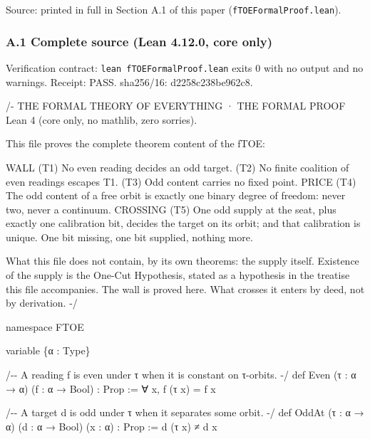 \documentclass[10pt]{article}
\renewcommand{\_}{\origunderscore\allowbreak}
\newenvironment{Shaded}{}{}
\newcommand{\NormalTok}[1]{#1}
\begin{document}
Source: printed in full in Section A.1 of this paper
(\texttt{fTOE\_Formal\_Proof.lean}).

\hypertarget{a.1-complete-source-lean-4.12.0-core-only}{%
\subsubsection{A.1 Complete source (Lean 4.12.0, core
only)}\label{a.1-complete-source-lean-4.12.0-core-only}}

Verification contract: \texttt{lean\ fTOE\_Formal\_Proof.lean} exits 0
with no output and no warnings. Receipt: PASS. sha256/16:
d2258c238be962c8.

\begin{Shaded}
\begin{Highlighting}[]
\NormalTok{/{-}}
\NormalTok{THE FORMAL THEORY OF EVERYTHING · THE FORMAL PROOF}
\NormalTok{Lean 4 (core only, no mathlib, zero sorries).}

\NormalTok{This file proves the complete theorem content of the fTOE:}

\NormalTok{  WALL      (T1) No even reading decides an odd target.}
\NormalTok{            (T2) No finite coalition of even readings escapes T1.}
\NormalTok{            (T3) Odd content carries no fixed point.}
\NormalTok{  PRICE     (T4) The odd content of a free orbit is exactly one binary}
\NormalTok{                 degree of freedom: never two, never a continuum.}
\NormalTok{  CROSSING  (T5) One odd supply at the seat, plus exactly one calibration}
\NormalTok{                 bit, decides the target on its orbit; and that calibration}
\NormalTok{                 is unique. One bit missing, one bit supplied, nothing more.}

\NormalTok{What this file does not contain, by its own theorems: the supply itself.}
\NormalTok{Existence of the supply is the One{-}Cut Hypothesis, stated as a hypothesis}
\NormalTok{in the treatise this file accompanies. The wall is proved here. What crosses}
\NormalTok{it enters by deed, not by derivation.}
\NormalTok{{-}/}

\NormalTok{namespace FTOE}

\NormalTok{variable \{α : Type\}}

\NormalTok{/{-}{-} A reading f is even under τ when it is constant on τ{-}orbits. {-}/}
\NormalTok{def Even (τ : α → α) (f : α → Bool) : Prop := ∀ x, f (τ x) = f x}

\NormalTok{/{-}{-} A target d is odd under τ when it separates some orbit. {-}/}
\NormalTok{def OddAt (τ : α → α) (d : α → Bool) (x : α) : Prop := d (τ x) ≠ d x}


\end{Highlighting}
\end{Shaded}
\end{document}

